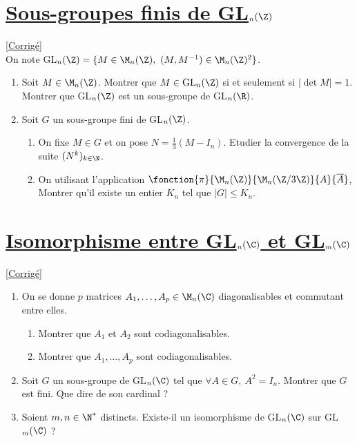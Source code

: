 \documentclass[8pt]{book}
\begin{document}
	\section{\underline{Sous-groupes finis de GL$_n(\Z)$} }
	\label{Sous-groupes finis de GLn(Z)}
	\textcolor{blue}{\hyperref[Sous-groupes finis de GLn(Z) corrigé]{[Corrigé]}}\\
	On note GL$_n(\Z)=\{ M\in \M_n(\Z),\ (M,M^{-1})\in \M_n(\Z)^2\}$.
	\begin{enumerate}
		\item Soit $M\in \M_{n}(\Z)$. Montrer que $M\in \text{GL}_n(\Z)$ si et seulement si $|\det M|=1$.\\
		Montrer que GL$_n(\Z)$ est un sous-groupe de GL$_n(\R)$.
		\item Soit $G$ un sous-groupe fini de GL$_n(\Z)$.
		\begin{enumerate}[label=\alph*.]
			\item On fixe $M\in G$ et on pose $N=\displaystyle\frac{1}{3}(M-I_n)$. Etudier la convergence de la suite $(N^k)_{k\in \N}$.
			\item On utilisant l'application $\fonction{\pi}{\M_n(\Z)}{\M_n(\Z/3\Z)}{A}{\overline{A}}$, Montrer qu'il existe un entier $K_n$ tel que $|G|\leq K_n$.
		\end{enumerate}
	\end{enumerate}
	
	\section{\underline{Isomorphisme entre GL$_n(\C)$ et GL$_m(\C)$} }
	\label{Isomorphisme entre GLn(C) et GLm(C)}
	\textcolor{blue}{\hyperref[Isomorphisme entre GLn(C) et GLm(C) corrigé]{[Corrigé]}}\\
		\begin{enumerate}[leftmargin=*]
		\item On se donne $p$ matrices $A_1,\dots,A_p\in \M_n(\C)$ diagonalisables et commutant entre elles.
		\begin{enumerate}[label=\alph*.]
			\item Montrer que $A_1$ et $A_2$ sont codiagonalisables.
			\item Montrer que $A_1,\dots,A_p$ sont codiagonalisables.
		\end{enumerate}
		\item Soit $G$ un sous-groupe de GL$_n(\C)$ tel que $\forall A\in G,\ A^2=I_n$. Montrer que $G$ est fini. Que dire de son cardinal ?
		\item Soient $m,n\in \N^*$ distincts. Existe-il un isomorphisme de GL$_n(\C)$ sur GL$_m(\C)$ ?
	\end{enumerate}
	
\end{document}
